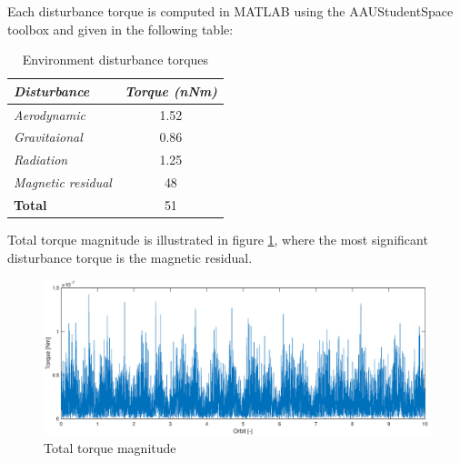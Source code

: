 Each disturbance torque is computed in MATLAB using the AAUStudentSpace toolbox and given in the following table:
\begin{table}[H]
	\centering
	\begin{tabular}{|l|c|}
		\hline
		\textit{\textbf{Disturbance}} & \multicolumn{1}{l|}{\textit{\textbf{Torque (nNm)}}} \\ \hline
		\textit{Aerodynamic}                   & 1.52                                               \\ \hline
		\textit{Gravitaional}                  &     0.86                                               \\ \hline
		\textit{Radiation}                     & 1.25                                                  \\ \hline
	\textit{Magnetic residual }            & 48                                                  \\ \hline
		\textbf{Total}                & 51                                                  \\ \hline
	\end{tabular}
\caption{Environment disturbance torques}
\label{TN}
\end{table}
Total torque magnitude is illustrated in figure \ref{fig:totalN}, where the most significant disturbance torque is the magnetic residual.
\begin{figure}[h!]
	\centering 
	\includegraphics[width=160mm]{figures/total_torque}	
	\caption{Total torque magnitude}
	\label{fig:totalN}
\end{figure}